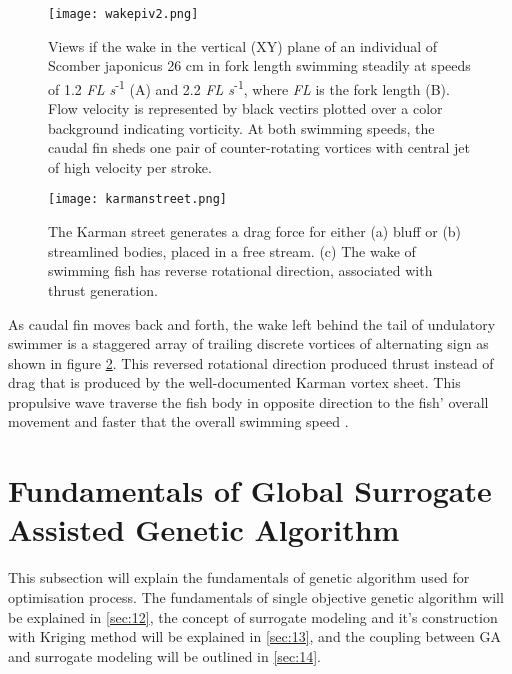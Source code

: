 \begin{figure}[H]
    \centering
    \texttt{[image: wakepiv2.png]}
    \caption{Views if the wake in the vertical (XY) plane of an individual of Scomber japonicus 26 cm in fork length swimming steadily at speeds of 1.2 \textit{FL s}\textsuperscript{-1} (A) and 2.2 \textit{FL s}\textsuperscript{-1}, where \textit{FL} is the fork length (B). Flow velocity is represented by black vectirs plotted over a color background indicating vorticity. At both swimming speeds, the caudal fin sheds one pair of counter-rotating vortices with central jet of high velocity per stroke.}
    \label{fig:wake2}
\end{figure}
\begin{figure}[H]
    \centering
    \texttt{[image: karmanstreet.png]}
    \caption{The Karman street generates a drag force for either (a) bluff or (b) streamlined bodies, placed in a free stream. (c) The wake of swimming fish has reverse rotational direction, associated with thrust generation.}
    \label{fig:karmanstreet}
\end{figure}
As caudal fin moves back and forth, the wake left behind the tail of undulatory swimmer is a staggered array of trailing discrete vortices of alternating sign as shown in figure \ref{fig:karmanstreet}. This reversed rotational direction produced thrust instead of drag that is produced by the well-documented Karman vortex sheet. This propulsive wave traverse the fish body in opposite direction to the fish' overall movement and faster that the overall swimming speed \citep{sfakiotakis}.
\section{Fundamentals of Global Surrogate Assisted Genetic Algorithm}
\label{sec:11}
This subsection will explain the fundamentals of genetic algorithm used for optimisation process. The fundamentals of single objective genetic algorithm will be explained in \ref{sec:12}, the concept of surrogate modeling and it's construction with Kriging method will be explained in \ref{sec:13}, and the coupling between GA and surrogate modeling will be outlined in \ref{sec:14}.
